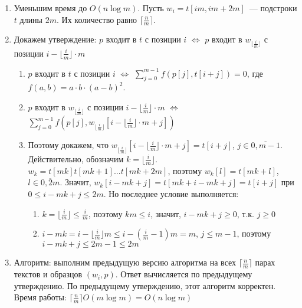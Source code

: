 \documentclass[a4paper]{article}
\begin{document}
\begin{enumerate}
\item Уменьшим время до $O(n\log m)$. Пусть $w_i=t[im,im+2m]$~--- подстроки $t$ длины $2m$. Их количество равно $\lceil\frac{n}{m}\rceil$.
\item Докажем утверждение: $p$ входит в $t$ с позиции $i$ $\Leftrightarrow$ $p$ входит в $w_{\lfloor\frac{i}{m}\rfloor}$ с позиции $i-\lfloor\frac{i}{m}\rfloor\cdot m$\begin{enumerate}
\item $p$ входит в $t$ с позиции $i$ $\Leftrightarrow$ $\sum\limits_{j=0}^{m-1}f(p[j],t[i+j])=0$, где $f(a,b)=a\cdot b\cdot(a-b)^2$.
\item $p$ входит в $w_{\lfloor\frac{i}{m}\rfloor}$ с позиции $i-\lfloor\frac{i}{m}\rfloor\cdot m$ $\Leftrightarrow$ $\sum\limits_{j=0}^{m-1}f(p[j],w_{\lfloor\frac{i}{m}\rfloor}[i-\lfloor\frac{i}{m}\rfloor\cdot m+j])$
\item Поэтому докажем, что $w_{\lfloor\frac{i}{m}\rfloor}[i-\lfloor\frac{i}{m}\rfloor\cdot m+j]=t[i+j]$, $j\in\overline{0,m-1}$. Действительно, обозначим $k=\lfloor\frac{i}{m}\rfloor$. $w_k=t[mk]t[mk+1]...t[mk+2m]$, поэтому $w_k[l]=t[mk+l]$, $l\in\overline{0,2m}$. Значит, $w_k[i-mk+j]=t[mk+i-mk+j]=t[i+j]$ при $0\leqslant i-mk+j\leqslant 2m$. Но последнее условие выполняется:\begin{enumerate}
\item $k=\lfloor\frac{i}{m}\rfloor\leqslant\frac{i}{m}$, поэтому $km\leqslant i$, значит, $i-mk+j\geqslant 0$, т.к. $j\geqslant 0$
\item $i-mk=i-\lfloor\frac{i}{m}\rfloor m\leqslant i-(\frac{i}{m}-1)m=m$, $j\leqslant m-1$, поэтому $i-mk+j\leqslant 2m-1\leqslant 2m$
\end{enumerate}
\end{enumerate}
\item Алгоритм: выполним предыдущую версию алгоритма на всех $\lceil\frac{n}{m}\rceil$ парах текстов и образцов $(w_i,p)$. Ответ вычисляется по предыдущему утверждению. По предыдущему утверждению, этот алгоритм корректен. Время работы: $\lceil\frac{n}{m}\rceil O(m\log m)=O(n\log m)$
\end{enumerate}
\end{document}

